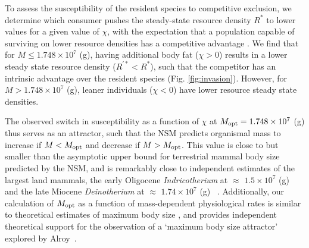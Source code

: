 \documentclass[twocolumn,preprintnumbers,amsmath,amssymb,superscriptaddress]{revtex4}
\begin{document}
\begin{bibunit}[unsrt]
  To assess the susceptibility of the resident species to competitive
  exclusion, we determine which consumer pushes the steady-state resource
  density $R^*$ to lower values for a given value of $\chi$, with the
  expectation that a population capable of surviving on lower resource
  densities has a competitive advantage \citep{tilman1981}.  We find that for
  $M\leq 1.748\times10^7$ (g), having additional body fat ($\chi > 0$) results
  in a lower steady state resource density ($R^{\prime *}<R^*$), such that the
  competitor has an intrinsic advantage over the resident species
  (Fig. \ref{fig:invasion}).  However, for $M> 1.748\times10^7$ (g), leaner
  individuals ($\chi < 0$) have lower resource steady state densities.


  The observed switch in susceptibility as a function of $\chi$ at
  $M_{\rm opt}= 1.748\times10^7$ (g) thus serves as an attractor, such that the
  NSM predicts organismal mass to increase if $M<M_{\rm opt}$ and decrease if
  $M>M_{\rm opt}$.  This value is close to but smaller than the asymptotic
  upper bound for terrestrial mammal body size predicted by the NSM, and is remarkably close to independent estimates of the largest land
  mammals, the early Oligocene \emph{Indricotherium} at $\approx$
  $1.5\times10^7$ (g) and the late Miocene \emph{Deinotherium} at $\approx$
  $1.74\times10^7$ (g) ~\citep{Smith:2010p3442}.  Additionally, our calculation
  of $M_{\rm opt}$ as a function of mass-dependent physiological rates is
  similar to theoretical estimates of maximum body size \citep{Clauset:2009fh},
  and provides independent theoretical support for the observation of a
  `maximum body size attractor' explored by Alroy~\citep{Alroy:1998p1594}.


\end{bibunit}
\end{document}
